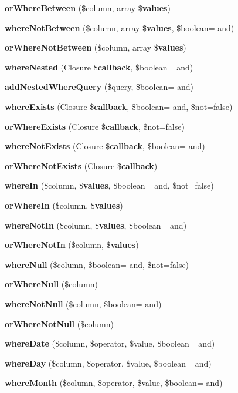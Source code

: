 \begin{DoxyCompactItemize}
\item 
{\bf or\+Where\+Between} (\$column, array \${\bf values})
\item 
{\bf where\+Not\+Between} (\$column, array \${\bf values}, \$boolean= \textquotesingle{}and\textquotesingle{})
\item 
{\bf or\+Where\+Not\+Between} (\$column, array \${\bf values})
\item 
{\bf where\+Nested} (Closure \${\bf callback}, \$boolean= \textquotesingle{}and\textquotesingle{})
\item 
{\bf add\+Nested\+Where\+Query} (\$query, \$boolean= \textquotesingle{}and\textquotesingle{})
\item 
{\bf where\+Exists} (Closure \${\bf callback}, \$boolean= \textquotesingle{}and\textquotesingle{}, \$not=false)
\item 
{\bf or\+Where\+Exists} (Closure \${\bf callback}, \$not=false)
\item 
{\bf where\+Not\+Exists} (Closure \${\bf callback}, \$boolean= \textquotesingle{}and\textquotesingle{})
\item 
{\bf or\+Where\+Not\+Exists} (Closure \${\bf callback})
\item 
{\bf where\+In} (\$column, \${\bf values}, \$boolean= \textquotesingle{}and\textquotesingle{}, \$not=false)
\item 
{\bf or\+Where\+In} (\$column, \${\bf values})
\item 
{\bf where\+Not\+In} (\$column, \${\bf values}, \$boolean= \textquotesingle{}and\textquotesingle{})
\item 
{\bf or\+Where\+Not\+In} (\$column, \${\bf values})
\item 
{\bf where\+Null} (\$column, \$boolean= \textquotesingle{}and\textquotesingle{}, \$not=false)
\item 
{\bf or\+Where\+Null} (\$column)
\item 
{\bf where\+Not\+Null} (\$column, \$boolean= \textquotesingle{}and\textquotesingle{})
\item 
{\bf or\+Where\+Not\+Null} (\$column)
\item 
{\bf where\+Date} (\$column, \$operator, \$value, \$boolean= \textquotesingle{}and\textquotesingle{})
\item 
{\bf where\+Day} (\$column, \$operator, \$value, \$boolean= \textquotesingle{}and\textquotesingle{})
\item 
{\bf where\+Month} (\$column, \$operator, \$value, \$boolean= \textquotesingle{}and\textquotesingle{})
\item 

\end{DoxyCompactItemize}
